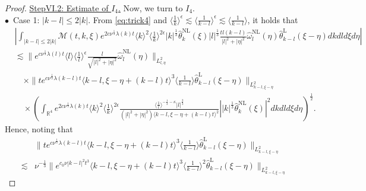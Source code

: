 \documentclass[reqno, 12pt]{amsart} %
\theoremstyle{plain} %
\theoremstyle{definition}
\theoremstyle{remark}
\numberwithin{equation}{section} %
\begin{document}
\begin{proof}
	    \underline{ StepVI.2: Estimate of $  I_4$.} 
		Now, we turn to $I_4$.\\
		$\bullet$~Case 1: $|k-l| \leq 2|k|$. From \eqref{eq:trick4} and $\langle\frac{1}{k}\rangle^\epsilon \lesssim\langle\frac{1}{k-l}\rangle^\epsilon  \lesssim  \langle \frac{1}{k-l} \rangle$, it holds that
		\begin{equation}\begin{aligned} \label{eq:im2}
				& \left|\int_{|k-l| \leq 2|k|}  \mathcal{M}(t, k, \xi) e^{2 c \nu^{\frac{1}{3}} \lambda(k) t}\langle k\rangle^2\langle\frac{1}{k}\rangle^{2 \epsilon} |k|^\frac13\hat{\theta}_k^{\mathrm{NL}}(\xi) |l|^\frac13  \frac{t l(k-l)}{|l|^2+|\eta|^2} \hat{\omega}_l^{\mathrm{NL}}(\eta) \hat{\theta}_{k-l}^{\mathrm{L}}(\xi-\eta)   d k d l d \xi d \eta\right| \\
				& \lesssim\|e^{c \nu^{\frac{1}{3}} \lambda(l) t}\langle l\rangle\langle\frac{1}{l}\rangle^\epsilon \frac{l}{\sqrt{|l|^2+|\eta|^2}} \hat{\omega}_l^{\mathrm{NL}}(\eta)\|_{L_{l, \eta}^2} \\
				& \quad \times\|t e^{c \nu^{\frac{1}{3}} \lambda(k-l) t}\langle k-l, \xi-\eta+(k-l) t\rangle^3\langle\frac{1}{k-l}\rangle   \hat{\theta}_{k-l}^{\mathrm{L}}(\xi-\eta)\|_{L_{k-l, \xi-\eta}^2} \\
				& \quad \times\left(\int_{\mathbb{R}^4} e^{2 c \nu^{\frac{1}{3}} \lambda(k) t}\langle k\rangle^2\langle\frac{1}{k}\rangle^{2 \epsilon}  \frac{\langle\frac{1}{l}\rangle^{-\frac13 - \kappa}  |l|^\frac23 }{\left(|l|^2+|\eta|^2\right)\langle k-l, \xi-\eta+(k-l) t\rangle^2}\left||k|^\frac13 \hat{\theta}_k^{\mathrm{NL}}(\xi)\right|^2 d k d l d \xi d \eta\right)^{\frac{1}{2}} .
		\end{aligned}\end{equation}
		Hence, noting that
		$$
		\begin{aligned}
			& \|t e^{c \nu^{\frac{1}{3}} \lambda(k-l) t}\langle k-l, \xi-\eta+(k-l) t\rangle^3\langle\frac{1}{k-l}\rangle  \hat{\theta}_{k-l}^{\mathrm{L}}(\xi-\eta)\|_{L_{k-l, \xi-\eta}^2} \\
			\lesssim & \nu^{-\frac{1}{3}}\|e^{c_0 \nu|k-l|^2 t^3}\langle k-l, \xi-\eta+(k-l) t\rangle^3\langle\frac{1}{k-l}\rangle^2 \hat{\theta}_{k-l}^{\mathrm{L}}(\xi-\eta)\|_{L_{k-l, \xi-\eta}^2}
		\end{aligned}
$$
\end{proof}
\end{document}
